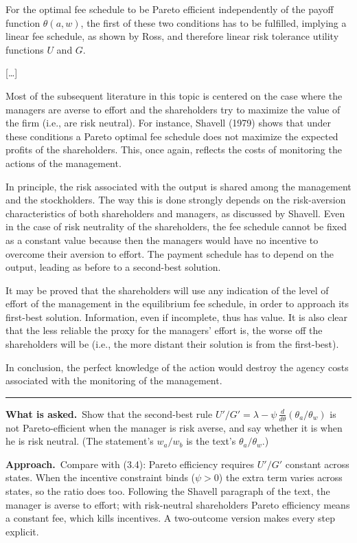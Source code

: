 \documentclass[11pt,a4paper]{article}
\newcommand{\asked}{\par\medskip\noindent\textbf{What is asked.}~}
\newcommand{\approach}{\par\smallskip\noindent\textbf{Approach.}~}
\newcommand{\stmtend}{\par\endgroup\nopagebreak\noindent\rule{\linewidth}{0.4pt}\par\medskip}
\begin{document}
For the optimal fee schedule to be Pareto efficient independently of the payoff function
\(\theta(a, w)\), the first of these two conditions has to be fulfilled, implying a linear fee
schedule, as shown by Ross, and therefore linear risk tolerance utility functions \(U\) and \(G\).

{[}\ldots{]}

Most of the subsequent literature in this topic is centered on the case where the managers are
averse to effort and the shareholders try to maximize the value of the firm (i.e., are risk
neutral). For instance, Shavell (1979) shows that under these conditions a Pareto optimal fee
schedule does not maximize the expected profits of the shareholders. This, once again, reflects the
costs of monitoring the actions of the management.

In principle, the risk associated with the output is shared among the management and the
stockholders. The way this is done strongly depends on the risk-aversion characteristics of both
shareholders and managers, as discussed by Shavell. Even in the case of risk neutrality of the
shareholders, the fee schedule cannot be fixed as a constant value because then the managers would
have no incentive to overcome their aversion to effort. The payment schedule has to depend on the
output, leading as before to a second-best solution.

It may be proved that the shareholders will use any indication of the level of effort of the
management in the equilibrium fee schedule, in order to approach its first-best solution.
Information, even if incomplete, thus has value. It is also clear that the less reliable the proxy
for the managers' effort is, the worse off the shareholders will be (i.e., the more distant their
solution is from the first-best).

In conclusion, the perfect knowledge of the action would destroy the agency costs associated with
the monitoring of the management.
\stmtend

\asked Show that the second-best rule $U'/G'=\lambda-\psi\,\frac{d}{d\theta}(\theta_a/\theta_w)$ is not Pareto-efficient when the manager is risk averse, and say whether it is when he is risk neutral. (The statement's $w_a/w_b$ is the text's $\theta_a/\theta_w$.)

\approach Compare with (3.4): Pareto efficiency requires $U'/G'$ constant across states. When the incentive constraint binds ($\psi>0$) the extra term varies across states, so the ratio does too. Following the Shavell paragraph of the text, the manager is averse to effort; with risk-neutral shareholders Pareto efficiency means a constant fee, which kills incentives. A two-outcome version makes every step explicit.
\end{document}
